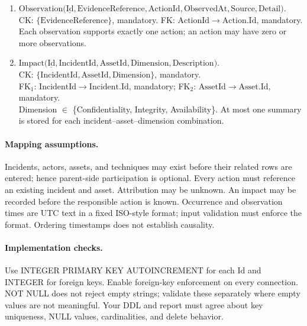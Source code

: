\documentclass[sigconf]{acmart}
\begin{document}
\begin{enumerate}
CK: \(\{\text{ActionId},\text{TechniqueId}\}\), mandatory.\\
FK\(_1\): \(\text{ActionId}\to \text{Action}.\text{Id}\), mandatory;
FK\(_2\): \(\text{TechniqueId}\to \text{Technique}.\text{Id}\), mandatory.\\
This associative relation implements the many-to-many action--technique relationship.
\item \(\text{Observation}\mathopen{(}\underline{\text{Id}},\text{EvidenceReference},\text{ActionId},\text{ObservedAt},\text{Source},\text{Detail}\mathclose{)}\).\\
CK: \(\{\text{EvidenceReference}\}\), mandatory.
FK: \(\text{ActionId}\to \text{Action}.\text{Id}\), mandatory.\\
Each observation supports exactly one action; an action may have zero or more observations.
\item \(\text{Impact}\mathopen{(}\underline{\text{Id}},\text{IncidentId},\text{AssetId},\text{Dimension},\text{Description}\mathclose{)}\).\\
CK: \(\{\text{IncidentId},\text{AssetId},\text{Dimension}\}\), mandatory.\\
FK\(_1\): \(\text{IncidentId}\to \text{Incident}.\text{Id}\), mandatory;
FK\(_2\): \(\text{AssetId}\to \text{Asset}.\text{Id}\), mandatory.\\
Dimension \(\in\) \{Confidentiality, Integrity, Availability\}. At most one summary
is stored for each incident--asset--dimension combination.
\end{enumerate}
\paragraph{Mapping assumptions.}
Incidents, actors, assets, and techniques may exist before their related rows are entered; hence parent-side participation is optional. Every action must reference an existing incident and asset. Attribution may be unknown. An impact may be recorded before the responsible action is known. Occurrence and observation times are UTC text in a fixed ISO-style format; input validation must enforce the format. Ordering timestamps does not establish causality.
\paragraph{Implementation checks.}
Use INTEGER PRIMARY KEY AUTOINCREMENT for each \(\text{Id}\) and INTEGER for foreign keys. Enable foreign-key enforcement on every connection. NOT NULL does not reject empty strings; validate these separately where empty values are not meaningful. Your DDL and report must agree about key uniqueness, NULL values, cardinalities, and delete behavior.
\end{document}

